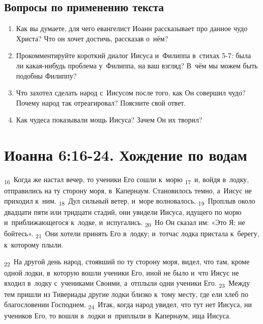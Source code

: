 \documentclass[a4paper,12pt]{article}
\begin{document}
\subsection*{Вопросы по применению текста} 
\begin{enumerate}
    \item Как вы думаете, для чего евангелист Иоанн рассказывает про данное чудо Христа? Что он хочет достичь, рассказав о~нём? 
    
    \myline
    
    \myline
    \item Прокомментируйте короткий диалог Иисуса и~Филиппа в~стихах 5-7: была ли какая-нибудь проблема у~Филиппа, на ваш взгляд? В~чём мы можем быть подобны Филиппу?
    
    \myline
    
    \myline
    \item Что захотел сделать народ с~Иисусом после того, как Он совершил чудо? Почему народ так отреагировал? Поясните свой ответ. 
    
    \myline
    
    \myline
    \item Как чудеса показывали мощь Иисуса? Зачем Он их творил? 
    
    \myline
    
    \myline
\end{enumerate}



\section{Иоанна 6:16-24. Хождение по водам}

\textsubscript{16}~Когда же настал вечер, то ученики Его сошли к~морю
\textsubscript{17}~и, войдя в~лодку, отправились на ту сторону моря, в~Капернаум. Становилось темно, а~Иисус не приходил к~ним.
\textsubscript{18}~Дул сильный ветер, и~море волновалось.
\textsubscript{19}~Проплыв около двадцати пяти или тридцати стадий, они увидели Иисуса, идущего по морю и~приближающегося к~лодке, и~испугались.
\textsubscript{20}~Но Он сказал им: «Это Я; не бойтесь».
\textsubscript{21}~Они хотели принять Его в~лодку; и~тотчас лодка пристала к~берегу, к~которому плыли. 

\textsubscript{22}~На другой день народ, стоявший по ту сторону моря, видел, что там, кроме одной лодки, в~которую вошли ученики Его, иной не было и~что Иисус не входил в~лодку с~учениками Своими, а~отплыли одни ученики Его.
\textsubscript{23}~Между тем пришли из Тивериады другие лодки близко к~тому месту, где ели хлеб по благословении Господнем.
\textsubscript{24}~Итак, когда народ увидел, что тут нет Иисуса, ни учеников Его, то вошли в~лодки и~приплыли в~Капернаум, ища Иисуса.
\end{document}
